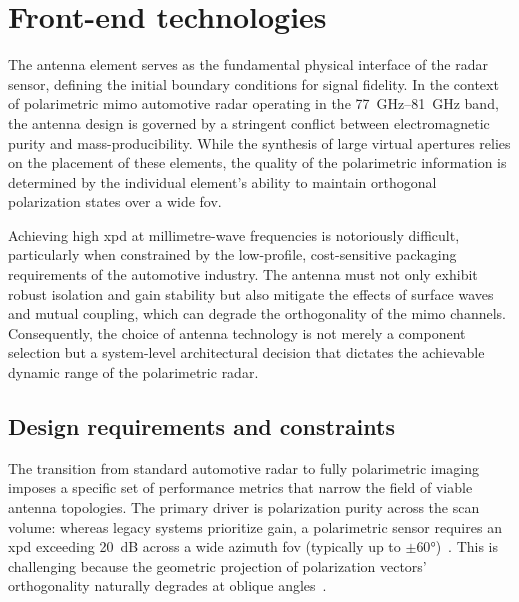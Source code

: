 \section{Front-end technologies}
\label{sec:frontend}

The antenna element serves as the fundamental physical interface of the radar sensor, defining the initial boundary conditions for signal fidelity.
In the context of polarimetric \gls{mimo} automotive radar operating in the \qtyrange{77}{81}{GHz} band, the antenna design is governed by a stringent conflict between electromagnetic purity and mass-producibility.
While the synthesis of large virtual apertures relies on the placement of these elements, the quality of the polarimetric information is determined by the individual element's ability to maintain orthogonal polarization states over a wide \gls{fov}.

Achieving high \gls{xpd} at millimetre-wave frequencies is notoriously difficult, particularly when constrained by the low-profile, cost-sensitive packaging requirements of the automotive industry.
The antenna must not only exhibit robust isolation and gain stability but also mitigate the effects of surface waves and mutual coupling, which can degrade the orthogonality of the \gls{mimo} channels.
Consequently, the choice of antenna technology is not merely a component selection but a system-level architectural decision that dictates the achievable dynamic range of the polarimetric radar.


\subsection{Design requirements and constraints}

The transition from standard automotive radar to fully polarimetric imaging imposes a specific set of performance metrics that narrow the field of viable antenna topologies.
The primary driver is polarization purity across the scan volume: whereas legacy systems prioritize gain, a polarimetric sensor requires an \gls{xpd} exceeding \qty{20}{dB} across a wide azimuth \gls{fov} (typically up to $\pm\ang{60}$)~\parencite{tintiFullyPolarimetricAutomotive2024}.
This is challenging because the geometric projection of polarization vectors' orthogonality naturally degrades at oblique angles~\parencite{zhaoOverviewPolarimetryApplication2025}.

